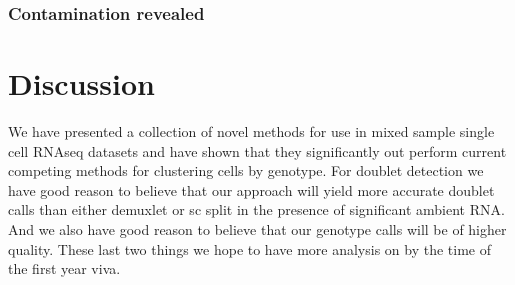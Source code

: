 \subsubsection{Contamination revealed}

\section{Discussion}
We have presented a collection of novel methods for use in mixed sample single cell RNAseq datasets and have shown that they significantly out perform current competing methods 
for clustering cells by genotype. For doublet detection we have good reason to believe that our approach will yield more accurate doublet calls than either demuxlet or sc split in the presence 
of significant ambient RNA. And we also have good reason to believe that our genotype calls will be of higher quality. These last two things we hope to have more analysis on by the time 
of the first year viva.



